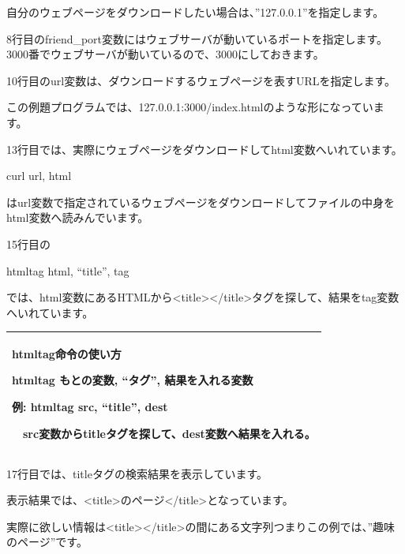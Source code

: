 \documentclass[a4paper,12pt,dvipdfmx]{jarticle}
\begin{document}
自分のウェブページをダウンロードしたい場合は、”127.0.0.1”を指定します。


\bigskip

8行目のfriend\_port変数にはウェブサーバが動いているポートを指定します。
3000番でウェブサーバが動いているので、3000にしておきます。


\bigskip

10行目のurl変数は、ダウンロードするウェブページを表すURLを指定します。

この例題プログラムでは、127.0.0.1:3000/index.htmlのような形になっています。


\bigskip

13行目では、実際にウェブページをダウンロードしてhtml変数へいれています。

curl url, html

はurl変数で指定されているウェブページをダウンロードしてファイルの中身をhtml変数へ読みんでいます。


\bigskip

\clearpage
15行目の

htmltag html, “title”, tag

では、html変数にあるHTMLから{\textless}title{\textgreater}{\textless}/title{\textgreater}タグを探して、結果をtag変数へいれています。


\bigskip

\begin{center}
\tablefirsthead{}
\tablehead{}
\tabletail{}
\tablelasttail{}
\begin{supertabular}{|m{16.806cm}|}
\hline
htmltag命令の使い方

\textbf{htmltag} \textbf{もとの変数, “タグ”,
結果を入れる変数}

例: htmltag src, “title”, dest

　src変数からtitleタグを探して、dest変数へ結果を入れる。\\\hline
\end{supertabular}
\end{center}

\bigskip

17行目では、titleタグの検索結果を表示しています。

表示結果では、{\textless}title{\textgreater}のページ{\textless}/title{\textgreater}となっています。

実際に欲しい情報は{\textless}title{\textgreater}{\textless}/title{\textgreater}の間にある文字列つまりこの例では、”趣味のページ”です。
\end{document}
